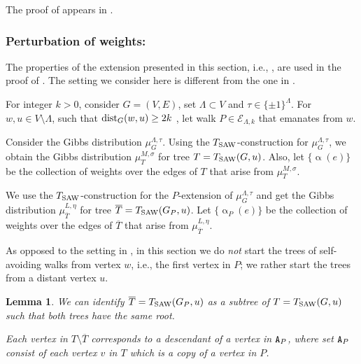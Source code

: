 \documentclass[11pt,reqno]{amsart}
\numberwithin{equation}{section}
\newtheorem{lemma}[theorem]{Lemma}
\newcommand{\cE}{{\mathcal{E}}}
\newcommand{\applegreen}[1]{ {\color{applegreen}#1}}
\newcommand{\blue}[1]{{\color{blue}#1}}
\newcommand{\bluepigment}[1]{{\color{blue(pigment)}#1}}
\newcommand{\byzantine}[1]{{\color{byzantine}#1}}
\newcommand{\cadmiumgreen}[1]{{\color{cadmiumgreen}#1}}
\newcommand{\cadmiumorange}[1]{{\color{cadmiumorange}#1}}
\newcommand{\electricviolet}[1]{{\color{electricviolet}#1}}
\newcommand{\goldenbrown}[1]{{\color{goldenbrown}#1}}
\newcommand{\magenta}[1]{{\color{magenta}#1}}
\newcommand{\iris}[1]{{\color{iris}#1}}
\newcommand{\red}[1]{{\color{red}#1}}
\newcommand{\dist}{{\rm dist}}
\newcommand{\ExtV}{\iris{\cE}}
\newcommand{\Tsaw}{T_{\rm SAW}}
\newcommand{\cp}{{\tt A}}
\renewcommand{\applegreen}[1]{#1}
\renewcommand{\blue}[1]{#1}
\renewcommand{\bluepigment}[1]{#1}
\renewcommand{\byzantine}[1]{#1}
\renewcommand{\cadmiumgreen}[1]{#1}
\renewcommand{\cadmiumorange}[1]{#1}
\renewcommand{\electricviolet}[1]{#1}
\renewcommand{\goldenbrown}[1]{#1}
\renewcommand{\magenta}[1]{#1}
\renewcommand{\iris}[1]{#1}
\renewcommand{\red}[1]{#1}
\newcommand{\ke}{\blue{e}}
\newcommand{\kk}{\bluepigment{k}}
\newcommand{\kL}{\cadmiumorange{L}}
\newcommand{\kP}{\goldenbrown{P}}
\newcommand{\ku}{\red{u}}
\newcommand{\kv}{\electricviolet{v}}
\newcommand{\kw}{\blue{w}}
\renewcommand{\ke}{e}
\renewcommand{\kk}{k}
\renewcommand{\kL}{L}
\renewcommand{\kP}{P}
\renewcommand{\ku}{u}
\renewcommand{\kv}{v}
\renewcommand{\kw}{w}
\newcommand{\infweight}{\upalpha}
\begin{document}
The proof of  appears in . 



\newcommand{\SMTu}{ \applegreen{T}}
\newcommand{\SMTPu}{\overline{\cadmiumgreen{T}}}


\newcommand{\cpT}{\byzantine{\cp}_{\kP}}
\newcommand{\cpTP}{\magenta{\overline{\cp}}_{\kP}}




 

\subsubsection{Perturbation of weights:}\label{sec:NonSoBasicExtensions}

The properties of the extension presented in this section, i.e., , are used in the proof
of . The setting we consider here is different from the one in .



For integer $\kk>0$, consider $G=(V,E)$, set $\Lambda\subset V$ and $\tau\in \{\pm 1\}^{\Lambda}$. For 
$\kw, \ku\in V\setminus \Lambda$, such that $\dist_{G}(\kw,\ku)\geq 2\kk$ , let walk $\kP\in \ExtV_{\Lambda, \kk}$  
that emanates from $\kw$. 
%





Consider the Gibbs distribution $\mu^{\Lambda,\tau}_G$.  Using the $\Tsaw$-construction for $\mu^{\Lambda,\tau}_G$, 
we obtain the Gibbs distribution $\mu^{M,\sigma}_{\SMTu}$ for tree $\SMTu=\Tsaw(G,\ku)$. Also,  let $\{ \infweight(e)\}$ 
be the collection of weights over the edges of $\SMTu$ that arise  from $\mu^{M,\sigma}_{\SMTu}$. 
 


We use the $\Tsaw$-construction for the $\kP$-extension of  $\mu^{\Lambda,\tau}_G$ and get the Gibbs distribution 
$\mu^{\kL,\eta}_{\SMTPu}$ for tree $\SMTPu=\Tsaw(\gext{G}{\kP},\ku)$.  Let $\{\infweight_{\kP}(\ke)\}$ be the collection 
of weights over the edges of $\SMTPu$ that arise  from $\mu^{\kL,\eta}_{\SMTPu}$.


As opposed to the setting in , in this section we do {\em not} start the trees of self-avoiding walks 
from  vertex $\kw$, i.e., the first vertex in $\kP$; we rather start the trees from a distant vertex $\ku$.




\begin{lemma}\label{lemma:Subtree4TSawU}
We can identify $\SMTPu=\Tsaw(\gext{G}{\kP}, \ku)$ as a subtree of $\SMTu=\Tsaw(G, \ku)$ such that both trees have 
the same root.

Each vertex in $\SMTu \setminus \SMTPu$ corresponds to a descendant of a vertex in $\cpT$,
where set $\cpT$ consist of each vertex $\kv$ in $\SMTu$ which is a copy of a vertex in $\kP$.
\end{lemma}
\end{document}
